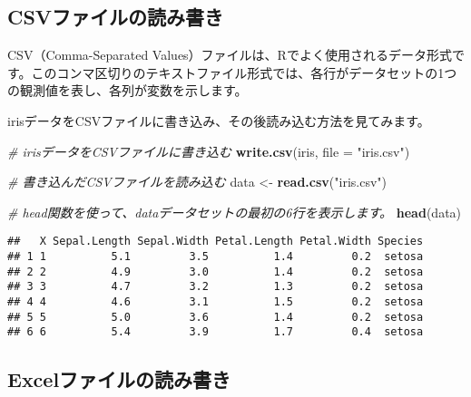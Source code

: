 \documentclass[
]{article}
\newenvironment{Shaded}{\begin{snugshade}}{\end{snugshade}}
\newcommand{\AttributeTok}[1]{\textcolor[rgb]{0.13,0.29,0.53}{#1}}
\newcommand{\CommentTok}[1]{\textcolor[rgb]{0.56,0.35,0.01}{\textit{#1}}}
\newcommand{\FunctionTok}[1]{\textcolor[rgb]{0.13,0.29,0.53}{\textbf{#1}}}
\newcommand{\NormalTok}[1]{#1}
\newcommand{\OtherTok}[1]{\textcolor[rgb]{0.56,0.35,0.01}{#1}}
\newcommand{\StringTok}[1]{\textcolor[rgb]{0.31,0.60,0.02}{#1}}
\begin{document}
\hypertarget{csvux30d5ux30a1ux30a4ux30ebux306eux8aadux307fux66f8ux304d}{%
\subsection{CSVファイルの読み書き}\label{csvux30d5ux30a1ux30a4ux30ebux306eux8aadux307fux66f8ux304d}}

CSV（Comma-Separated
Values）ファイルは、Rでよく使用されるデータ形式です。このコンマ区切りのテキストファイル形式では、各行がデータセットの1つの観測値を表し、各列が変数を示します。

irisデータをCSVファイルに書き込み、その後読み込む方法を見てみます。

\begin{Shaded}
\begin{Highlighting}[]
\CommentTok{\# irisデータをCSVファイルに書き込む}
\FunctionTok{write.csv}\NormalTok{(iris, }\AttributeTok{file =} \StringTok{"iris.csv"}\NormalTok{)}

\CommentTok{\# 書き込んだCSVファイルを読み込む}
\NormalTok{data }\OtherTok{\textless{}{-}} \FunctionTok{read.csv}\NormalTok{(}\StringTok{"iris.csv"}\NormalTok{)}
\end{Highlighting}
\end{Shaded}

\begin{Shaded}
\begin{Highlighting}[]
\CommentTok{\# \textquotesingle{}head\textquotesingle{}関数を使って、\textquotesingle{}data\textquotesingle{}データセットの最初の6行を表示します。}
\FunctionTok{head}\NormalTok{(data)}
\end{Highlighting}
\end{Shaded}

\begin{verbatim}
##   X Sepal.Length Sepal.Width Petal.Length Petal.Width Species
## 1 1          5.1         3.5          1.4         0.2  setosa
## 2 2          4.9         3.0          1.4         0.2  setosa
## 3 3          4.7         3.2          1.3         0.2  setosa
## 4 4          4.6         3.1          1.5         0.2  setosa
## 5 5          5.0         3.6          1.4         0.2  setosa
## 6 6          5.4         3.9          1.7         0.4  setosa
\end{verbatim}

\hypertarget{excelux30d5ux30a1ux30a4ux30ebux306eux8aadux307fux66f8ux304d}{%
\subsection{Excelファイルの読み書き}\label{excelux30d5ux30a1ux30a4ux30ebux306eux8aadux307fux66f8ux304d}}
\end{document}
